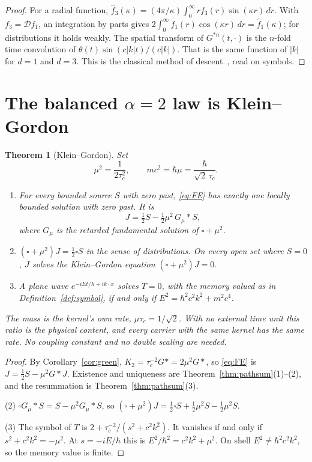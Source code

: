 \documentclass[11pt]{amsart}
\newtheorem{theorem}{Theorem}[section]
\theoremstyle{definition}
\theoremstyle{remark}
\newcommand{\Desc}{\mathcal D}
\begin{document}
\begin{proof}
For a radial function, $\hat f_3(\kappa)=(4\pi/\kappa)\int_0^\infty rf_3(r)\sin(\kappa r)\,dr$. With $f_3=\Desc f_1$, an integration by parts gives $2\int_0^\infty f_1(r)\cos(\kappa r)\,dr=\hat f_1(\kappa)$; for distributions it holds weakly. The spatial transform of $G^{*n}(t,\cdot)$ is the $n$-fold time convolution of $\theta(t)\sin(c\lvert k\rvert t)/(c\lvert k\rvert)$. That is the same function of $\lvert k\rvert$ for $d=1$ and $d=3$. This is the classical method of descent~\cite{CH}, read on symbols.
\end{proof}

\section{The balanced \texorpdfstring{$\alpha=2$}{alpha=2} law is Klein--Gordon}

\begin{theorem}[Klein--Gordon]\label{thm:KG}
Set
\[
\mu^2=\frac{1}{2\tau_c^2},\qquad mc^2=\hbar\mu=\frac{\hbar}{\sqrt2\,\tau_c}.
\]
\begin{enumerate}
\item For every bounded source $S$ with zero past, \eqref{eq:FE} has exactly one locally bounded solution with zero past. It is
\[
J=\tfrac12S-\tfrac12\mu^2\,G_\mu*S,
\]
where $G_\mu$ is the retarded fundamental solution of $\square+\mu^2$.
\item $(\square+\mu^2)J=\tfrac12\square S$ in the sense of distributions. On every open set where $S=0$, $J$ solves the Klein--Gordon equation $(\square+\mu^2)J=0$.
\item A plane wave $e^{-iEt/\hbar+ik\cdot x}$ solves $T=0$, with the memory valued as in Definition~\ref{def:symbol}, if and only if $E^2=\hbar^2c^2k^2+m^2c^4$.
\end{enumerate}
The mass is the kernel's own rate, $\mu\tau_c=1/\sqrt2$. With no external time unit this ratio is the physical content, and every carrier with the same kernel has the same rate. No coupling constant and no double scaling are needed.
\end{theorem}

\begin{proof}
By Corollary~\ref{cor:green}, $K_2=\tau_c^{-2}G*=2\mu^2G*$, so \eqref{eq:FE} is $J=\tfrac12S-\mu^2G*J$. Existence and uniqueness are Theorem~\ref{thm:pathsum}(1)--(2), and the resummation is Theorem~\ref{thm:pathsum}(3).

(2) $\square G_\mu*S=S-\mu^2G_\mu*S$, so $(\square+\mu^2)J=\tfrac12\square S+\tfrac12\mu^2S-\tfrac12\mu^2S$.

(3) The symbol of $T$ is $2+\tau_c^{-2}/(s^2+c^2k^2)$. It vanishes if and only if $s^2+c^2k^2=-\mu^2$. At $s=-iE/\hbar$ this is $E^2/\hbar^2=c^2k^2+\mu^2$. On shell $E^2\ne\hbar^2c^2k^2$, so the memory value is finite.
\end{proof}
\end{document}
